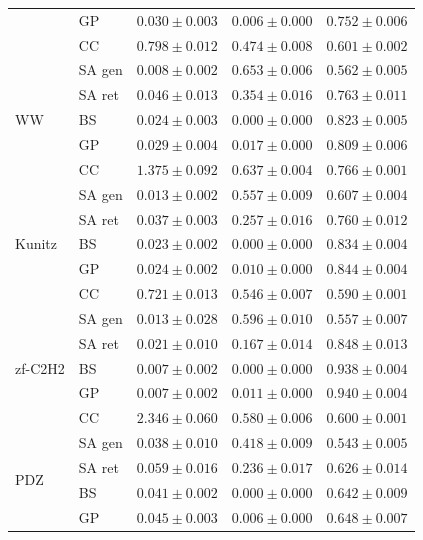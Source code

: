 \documentclass[10pt]{article}
\begin{document}
\begin{table}[ht]
\begin{tabular}{@{}llccc@{}}
 & GP      & $\mathbf{0.030 \pm 0.003}$ & $0.006 \pm 0.000$ & $0.752 \pm 0.006$ \\
 & CC      & $0.798 \pm 0.012$ & $0.474 \pm 0.008$ & $0.601 \pm 0.002$ \\
\midrule
\multirow{5}{*}{WW}
 & SA gen  & $\mathbf{0.008 \pm 0.002}$ & $\mathbf{0.653 \pm 0.006}$ & $\mathbf{0.562 \pm 0.005}$ \\
 & SA ret  & $0.046 \pm 0.013$ & $0.354 \pm 0.016$ & $0.763 \pm 0.011$ \\
 & BS      & $0.024 \pm 0.003$ & $0.000 \pm 0.000$ & $0.823 \pm 0.005$ \\
 & GP      & $0.029 \pm 0.004$ & $0.017 \pm 0.000$ & $0.809 \pm 0.006$ \\
 & CC      & $1.375 \pm 0.092$ & $0.637 \pm 0.004$ & $0.766 \pm 0.001$ \\
\midrule
\multirow{5}{*}{Kunitz}
 & SA gen  & $\mathbf{0.013 \pm 0.002}$ & $\mathbf{0.557 \pm 0.009}$ & $\mathbf{0.607 \pm 0.004}$ \\
 & SA ret  & $0.037 \pm 0.003$ & $0.257 \pm 0.016$ & $0.760 \pm 0.012$ \\
 & BS      & $0.023 \pm 0.002$ & $0.000 \pm 0.000$ & $0.834 \pm 0.004$ \\
 & GP      & $0.024 \pm 0.002$ & $0.010 \pm 0.000$ & $0.844 \pm 0.004$ \\
 & CC      & $0.721 \pm 0.013$ & $0.546 \pm 0.007$ & $0.590 \pm 0.001$ \\
\midrule
\multirow{5}{*}{zf-C2H2}
 & SA gen  & $0.013 \pm 0.028$ & $\mathbf{0.596 \pm 0.010}$ & $\mathbf{0.557 \pm 0.007}$ \\
 & SA ret  & $0.021 \pm 0.010$ & $0.167 \pm 0.014$ & $0.848 \pm 0.013$ \\
 & BS      & $\mathbf{0.007 \pm 0.002}$ & $0.000 \pm 0.000$ & $0.938 \pm 0.004$ \\
 & GP      & $\mathbf{0.007 \pm 0.002}$ & $0.011 \pm 0.000$ & $0.940 \pm 0.004$ \\
 & CC      & $2.346 \pm 0.060$ & $0.580 \pm 0.006$ & $0.600 \pm 0.001$ \\
\midrule
\multirow{5}{*}{PDZ}
 & SA gen  & $\mathbf{0.038 \pm 0.010}$ & $\mathbf{0.418 \pm 0.009}$ & $\mathbf{0.543 \pm 0.005}$ \\
 & SA ret  & $0.059 \pm 0.016$ & $0.236 \pm 0.017$ & $0.626 \pm 0.014$ \\
 & BS      & $0.041 \pm 0.002$ & $0.000 \pm 0.000$ & $0.642 \pm 0.009$ \\
 & GP      & $0.045 \pm 0.003$ & $0.006 \pm 0.000$ & $0.648 \pm 0.007$ \\

\end{tabular}
\end{table}
\end{document}
